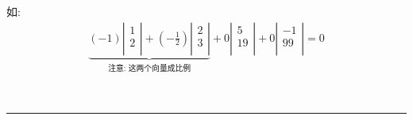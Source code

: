 \documentclass[UTF8]{ctexart}
\begin{document}
如:
\begin{align*}
	\underset{ \text{注意:\ 这两个向量成比例}}{\underbrace{(-1)\left| \begin{array}{l}
				                                                                  1 \\
				                                                                  2 \\
			                                                                  \end{array} \right|+(-\frac{1}{2})\left| \begin{array}{l}
				                                                                                                           2 \\
				                                                                                                           3 \\
			                                                                                                           \end{array} \right|}}+0\left| \begin{array}{l}
		                                                                                                                                         5  \\
		                                                                                                                                         19 \\
	                                                                                                                                         \end{array} \right|+0\left| \begin{array}{l}
		                                                                                                                                                                     -1 \\
		                                                                                                                                                                     99 \\
	                                                                                                                                                                     \end{array} \right|=0
\end{align*}

~\\
\hrule
~\\
\end{document}
